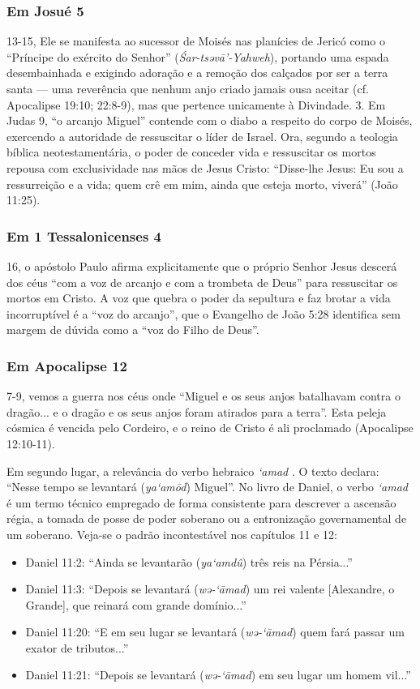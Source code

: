 \subsubsection*{Em Josué 5}
13-15, Ele se manifesta ao sucessor de Moisés nas planícies de Jericó como o ``Príncipe do exército do Senhor'' (\textit{Śar-tsəvā’-Yahweh}), portando uma espada desembainhada e exigindo adoração e a remoção dos calçados por ser a terra santa — uma reverência que nenhum anjo criado jamais ousa aceitar (cf. Apocalipse 19:10; 22:8-9), mas que pertence unicamente à Divindade.
3. Em Judas 9, ``o arcanjo Miguel'' contende com o diabo a respeito do corpo de Moisés, exercendo a autoridade de ressuscitar o líder de Israel. Ora, segundo a teologia bíblica neotestamentária, o poder de conceder vida e ressuscitar os mortos repousa com exclusividade nas mãos de Jesus Cristo: ``Disse-lhe Jesus: Eu sou a ressurreição e a vida; quem crê em mim, ainda que esteja morto, viverá'' (João 11:25).

\subsubsection*{Em 1 Tessalonicenses 4}
16, o apóstolo Paulo afirma explicitamente que o próprio Senhor Jesus descerá dos céus ``com a voz de arcanjo e com a trombeta de Deus'' para ressuscitar os mortos em Cristo. A voz que quebra o poder da sepultura e faz brotar a vida incorruptível é a ``voz do arcanjo'', que o Evangelho de João 5:28 identifica sem margem de dúvida como a ``voz do Filho de Deus''.

\subsubsection*{Em Apocalipse 12}
7-9, vemos a guerra nos céus onde ``Miguel e os seus anjos batalhavam contra o dragão... e o dragão e os seus anjos foram atirados para a terra''. Esta peleja cósmica é vencida pelo Cordeiro, e o reino de Cristo é ali proclamado (Apocalipse 12:10-11).

Em segundo lugar, a relevância do verbo hebraico \textit{‘amad} . O texto declara: ``Nesse tempo se levantará (\textit{ya‘amōd}) Miguel''. No livro de Daniel, o verbo \textit{‘amad} é um termo técnico empregado de forma consistente para descrever a ascensão régia, a tomada de posse de poder soberano ou a entronização governamental de um soberano. Veja-se o padrão incontestável nos capítulos 11 e 12:
\begin{itemize}
  \item Daniel 11:2: ``Ainda se levantarão (\textit{ya‘amdû}) três reis na Pérsia...''
  \item Daniel 11:3: ``Depois se levantará (\textit{wə-‘āmad}) um rei valente [Alexandre, o Grande], que reinará com grande domínio...''
  \item Daniel 11:20: ``E em seu lugar se levantará (\textit{wə-‘āmad}) quem fará passar um exator de tributos...''
  \item Daniel 11:21: ``Depois se levantará (\textit{wə-‘āmad}) em seu lugar um homem vil...''
\end{itemize}


